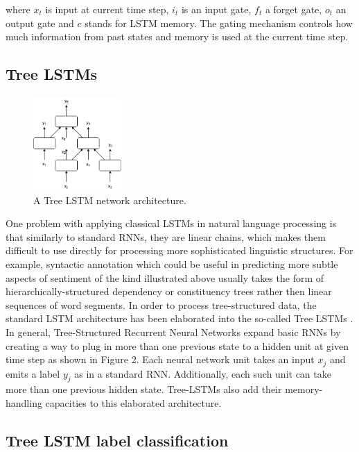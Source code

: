 \documentclass[10pt, a4paper]{article}
\begin{document}
		where $x_t$ is input at current time step, $i_t$ is an input gate, $f_t$ a forget gate, $o_t$ an output gate and $c$ stands for LSTM memory.
		The gating mechanism controls how much information from past states and memory is used at the current time step. 

\subsection{Tree LSTMs}
\begin{figure}[h]
	\begin{center}
		\includegraphics[width=0.3\textwidth]{imgs/tree-lstm}
		\caption{A Tree LSTM network architecture.}
		\label{tab:tree-lstm}
	\end{center}
\end{figure}
	One problem with applying classical LSTMs in natural language processing is that similarly to standard RNNs, they are linear chains, which makes them difficult to use directly for processing more sophisticated linguistic structures. For example, syntactic annotation which could be useful in predicting more subtle aspects of sentiment of the kind illustrated above usually takes the form of hierarchically-structured dependency or constituency trees rather then linear sequences of word segments. In order to process tree-structured data, the standard LSTM architecture has been elaborated into the so-called Tree LSTMs \cite{tai2015improved}.
	In general, Tree-Structured Recurrent Neural Networks expand basic RNNs by creating a way to plug in more than one previous state to a hidden unit at given time step as shown in Figure 2. Each neural network unit takes an input $x_j$ and emits a label $y_j$ as in a standard RNN. Additionally, each such unit can take more than one previous hidden state. Tree-LSTMs also add their memory-handling capacities to this elaborated architecture.
	
\subsection{Tree LSTM label classification}
\end{document}
